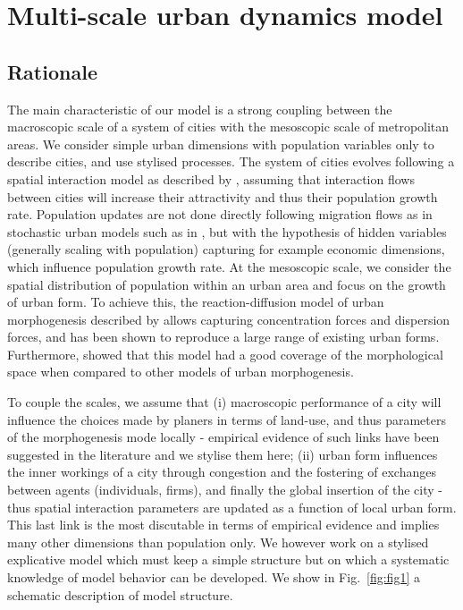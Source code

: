 \documentclass[11pt]{article}
\begin{document}
\section{Multi-scale urban dynamics model}

\subsection{Rationale}


The main characteristic of our model is a strong coupling between the macroscopic scale of a system of cities with the mesoscopic scale of metropolitan areas. We consider simple urban dimensions with population variables only to describe cities, and use stylised processes. The system of cities evolves following a spatial interaction model as described by \cite{raimbault2020indirect}, assuming that interaction flows between cities will increase their attractivity and thus their population growth rate. Population updates are not done directly following migration flows as in stochastic urban models such as in \cite{james2018zipf}, but with the hypothesis of hidden variables (generally scaling with population) capturing for example economic dimensions, which influence population growth rate. At the mesoscopic scale, we consider the spatial distribution of population within an urban area and focus on the growth of urban form. To achieve this, the reaction-diffusion model of urban morphogenesis described by \cite{raimbault2018calibration} allows capturing concentration forces and dispersion forces, and has been shown to reproduce a large range of existing urban forms. Furthermore, \cite{raimbault2020comparison} showed that this model had a good coverage of the morphological space when compared to other models of urban morphogenesis.

To couple the scales, we assume that (i) macroscopic performance of a city will influence the choices made by planers in terms of land-use, and thus parameters of the morphogenesis mode locally - empirical evidence of such links have been suggested in the literature \cite{joy2015toronto} and we stylise them here; (ii) urban form influences the inner workings of a city through congestion and the fostering of exchanges between agents (individuals, firms), and finally the global insertion of the city - thus spatial interaction parameters are updated as a function of local urban form. This last link is the most discutable in terms of empirical evidence and implies many other dimensions than population only. We however work on a stylised explicative model which must keep a simple structure but on which a systematic knowledge of model behavior can be developed. We show in Fig.~\ref{fig:fig1} a schematic description of model structure.
\end{document}
